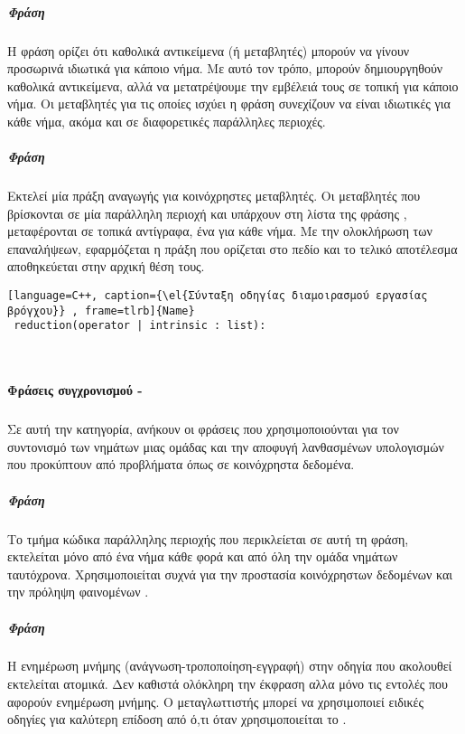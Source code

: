 \clearpage
\subparagraph{Φράση \emph{}}
\subparagraph{}
Η φράση \emph{} ορίζει ότι καθολικά αντικείμενα (ή μεταβλητές) μπορούν να γίνουν προσωρινά ιδιωτικά για κάποιο νήμα. Με αυτό τον τρόπο, μπορούν δημιουργηθούν καθολικά αντικείμενα, αλλά να μετατρέψουμε την εμβέλειά τους σε τοπική για κάποιο νήμα. Οι μεταβλητές για τις οποίες ισχύει η φράση \emph{} συνεχίζουν να είναι ιδιωτικές για κάθε νήμα, ακόμα και σε διαφορετικές παράλληλες περιοχές\cite{pdplab}.

\subparagraph{Φράση \emph{}}
\subparagraph{}
Εκτελεί μία πράξη αναγωγής για κοινόχρηστες μεταβλητές. Οι μεταβλητές που βρίσκονται σε μία παράλληλη περιοχή και υπάρχουν στη λίστα της φράσης \emph{}, μεταφέρονται σε τοπικά αντίγραφα, ένα για κάθε νήμα. Με την ολοκλήρωση των επαναλήψεων, εφαρμόζεται η πράξη που ορίζεται στο πεδίο \emph{} και το τελικό αποτέλεσμα αποθηκεύεται στην αρχική θέση τους\cite{pdplab}.
\begin{lstlisting}[language=C++, caption={\el{Σύνταξη οδηγίας διαμοιρασμού εργασίας βρόγχου}} , frame=tlrb]{Name}
 reduction(operator | intrinsic : list):\end{lstlisting}

\ \\
\paragraph{Φράσεις συγχρονισμού - \emph{}}
\subparagraph{}
Σε αυτή την κατηγορία, ανήκουν οι φράσεις που χρησιμοποιούνται για τον συντονισμό των νημάτων μιας ομάδας και την αποφυγή λανθασμένων υπολογισμών που προκύπτουν από προβλήματα όπως \emph{} σε κοινόχρηστα δεδομένα.

\subparagraph{Φράση \emph{}}
\subparagraph{}
Το τμήμα κώδικα παράλληλης περιοχής που περικλείεται σε αυτή τη φράση, εκτελείται μόνο από ένα νήμα κάθε φορά και από όλη την ομάδα νημάτων ταυτόχρονα. Χρησιμοποιείται συχνά για την προστασία κοινόχρηστων δεδομένων και την πρόληψη φαινομένων \emph{}.

\subparagraph{Φράση \emph{}}
\subparagraph{}
H ενημέρωση μνήμης (ανάγνωση-τροποποίηση-εγγραφή) στην οδηγία που ακολουθεί εκτελείται ατομικά. Δεν καθιστά ολόκληρη την έκφραση \emph{} αλλα μόνο τις εντολές που αφορούν ενημέρωση μνήμης. Ο μεταγλωττιστής μπορεί να χρησιμοποιεί ειδικές οδηγίες \emph{} για καλύτερη επίδοση από ό,τι όταν χρησιμοποιείται το \emph{}.
      
